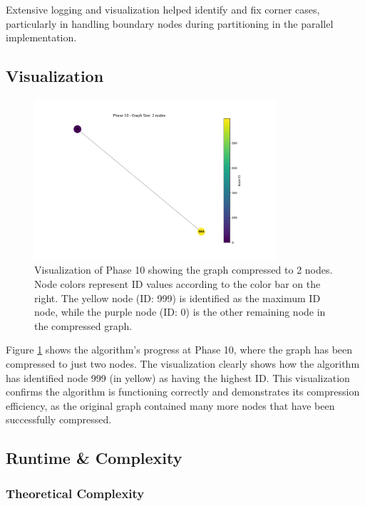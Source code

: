 \documentclass[11pt,a4paper]{article}
\begin{document}
Extensive logging and visualization helped identify and fix corner cases, particularly in handling boundary nodes during partitioning in the parallel implementation.

\subsection{Visualization}

\begin{figure}[H]
    \centering
    \includegraphics[width=0.8\textwidth]{phase_10_visualization.png}
    \caption{Visualization of Phase 10 showing the graph compressed to 2 nodes. Node colors represent ID values according to the color bar on the right. The yellow node (ID: 999) is identified as the maximum ID node, while the purple node (ID: 0) is the other remaining node in the compressed graph.}
    \label{fig:phase10}
\end{figure}

Figure \ref{fig:phase10} shows the algorithm's progress at Phase 10, where the graph has been compressed to just two nodes. The visualization clearly shows how the algorithm has identified node 999 (in yellow) as having the highest ID. This visualization confirms the algorithm is functioning correctly and demonstrates its compression efficiency, as the original graph contained many more nodes that have been successfully compressed.

\subsection{Runtime \& Complexity}

\subsubsection{Theoretical Complexity}
\end{document}
